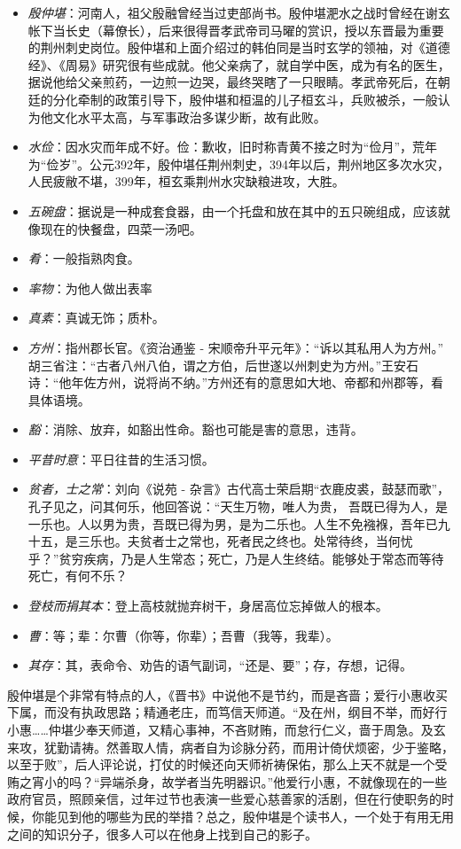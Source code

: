 \documentclass[]{book}
\providecommand{\tightlist}{%
  \setlength{\itemsep}{0pt}\setlength{\parskip}{0pt}}
\begin{document}
\begin{itemize}
\tightlist
\item
  \emph{殷仲堪}：河南人，祖父殷融曾经当过吏部尚书。殷仲堪淝水之战时曾经在谢玄帐下当长史（幕僚长），后来很得晋孝武帝司马曜的赏识，授以东晋最为重要的荆州刺史岗位。殷仲堪和上面介绍过的韩伯同是当时玄学的领袖，对《道德经》、《周易》研究很有些成就。他父亲病了，就自学中医，成为有名的医生，据说他给父亲煎药，一边煎一边哭，最终哭瞎了一只眼睛。孝武帝死后，在朝廷的分化牵制的政策引导下，殷仲堪和桓温的儿子桓玄斗，兵败被杀，一般认为他文化水平太高，与军事政治多谋少断，故有此败。
\item
  \emph{水俭}：因水灾而年成不好。俭：歉收，旧时称青黄不接之时为``俭月''，荒年为``俭岁''。公元392年，殷仲堪任荆州刺史，394年以后，荆州地区多次水灾，人民疲敝不堪，399年，桓玄乘荆州水灾缺粮进攻，大胜。
\item
  \emph{五碗盘}：据说是一种成套食器，由一个托盘和放在其中的五只碗组成，应该就像现在的快餐盘，四菜一汤吧。
\item
  \emph{肴}：一般指熟肉食。
\item
  \emph{率物}：为他人做出表率
\item
  \emph{真素}：真诚无饰；质朴。
\item
  \emph{方州}：指州郡长官。《资治通鉴 -
  宋顺帝升平元年》：``诉以其私用人为方州。''
  胡三省注：``古者八州八伯，谓之方伯，后世遂以州刺史为方州。''王安石诗：``他年佐方州，说将尚不纳。''方州还有的意思如大地、帝都和州郡等，看具体语境。
\item
  \emph{豁}：消除、放弃，如豁出性命。豁也可能是害的意思，违背。
\item
  \emph{平昔时意}：平日往昔的生活习惯。
\item
  \emph{贫者，士之常}：刘向《说苑 -
  杂言》古代高士荣启期``衣鹿皮裘，鼓瑟而歌''，孔子见之，问其何乐，他回答说：``天生万物，唯人为贵，
  吾既已得为人，是一乐也。人以男为贵，吾既已得为男，是为二乐也。人生不免襁褓，吾年已九十五，是三乐也。夫贫者士之常也，死者民之终也。处常待终，当何忧乎？''贫穷疾病，乃是人生常态；死亡，乃是人生终结。能够处于常态而等待死亡，有何不乐？
\item
  \emph{登枝而捐其本}：登上高枝就抛弃树干，身居高位忘掉做人的根本。
\item
  \emph{曹}：等；辈：尔曹（你等，你辈）；吾曹（我等，我辈）。
\item
  \emph{其存}：其，表命令、劝告的语气副词，``还是、要''；存，存想，记得。
\end{itemize}

殷仲堪是个非常有特点的人，《晋书》中说他不是节约，而是吝啬；爱行小惠收买下属，而没有执政思路；精通老庄，而笃信天师道。``及在州，纲目不举，而好行小惠\ldots{}\ldots{}仲堪少奉天师道，又精心事神，不吝财贿，而怠行仁义，啬于周急。及玄来攻，犹勤请祷。然善取人情，病者自为诊脉分药，而用计倚伏烦密，少于鉴略，以至于败''，后人评论说，打仗的时候还向天师祈祷保佑，那么上天不就是一个受贿之宵小的吗？``异端杀身，故学者当先明器识。''他爱行小惠，不就像现在的一些政府官员，照顾亲信，过年过节也表演一些爱心慈善家的活剧，但在行使职务的时候，你能见到他的哪些为民的举措？总之，殷仲堪是个读书人，一个处于有用无用之间的知识分子，很多人可以在他身上找到自己的影子。
\end{document}

